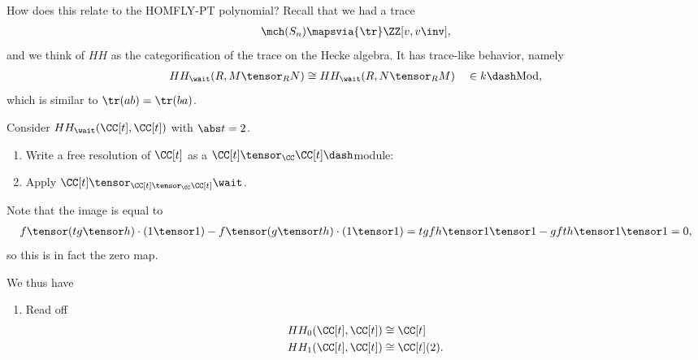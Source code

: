 How does this relate to the HOMFLY-PT polynomial? Recall that we had a
trace
\begin{align*} 
\mch(S_n) \mapsvia{\tr}  \ZZ[ v, v\inv]
,\end{align*} and we think of \(HH\) as the categorification of the
trace on the Hecke algebra. It has trace-like behavior, namely
\begin{align*}
HH_\wait(R, M\tensor_R N) \cong HH_\wait(R, N\tensor_R M) \quad \in k\dash\text{Mod}
,\end{align*} which is similar to \(\tr(ab) = \tr(ba)\).

\begin{example}

Consider \(HH_\wait(\CC[t], \CC[t])\) with \(\abs t = 2\).

\begin{enumerate}
\def\labelenumi{\arabic{enumi}.}
\tightlist
\item
  Write a free resolution of \(\CC[t]\) as a
  \(\CC[t] \tensor_\CC \CC[t]\dash\)module:

  \begin{center}\end{center}
\item
  Apply \(\CC[t] \tensor_{\CC[t] \tensor_\CC \CC[t]} \wait\).

  \begin{center}\end{center}
\end{enumerate}

Note that the image is equal to
\begin{align*}
f \tensor (tg\tensor h) \cdot (1\tensor 1) - f\tensor (g\tensor th)\cdot (1\tensor 1) = 
tgfh \tensor 1\tensor 1 - gfth \tensor 1 \tensor 1 = 0
,\end{align*} so this is in fact the zero map.

We thus have

\begin{center}\end{center}

\begin{enumerate}
\def\labelenumi{\arabic{enumi}.}
\setcounter{enumi}{2}
\tightlist
\item
  Read off
  \begin{align*}  
  HH_0(\CC[t], \CC[t]) &\cong \CC[t] \\
  HH_1(\CC[t], \CC[t]) &\cong \CC[t](2)
  .\end{align*}
\end{enumerate}

\end{example}

